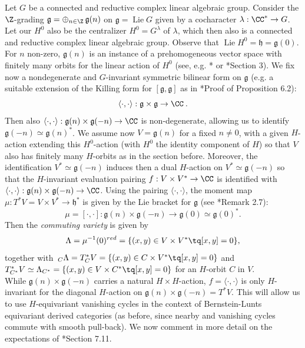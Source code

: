 \documentclass[11pt,letterpaper]{amsart}
\numberwithin{equation}{section}
\begin{document}
Let $G$ be a connected and reductive complex linear algebraic group. 
Consider the $\Z$-grading $\mathfrak{g} = \mathop{\oplus}_{n\in \Z} \mathfrak{g}(n)$ on $\mathfrak{g} = \operatorname{Lie} G$ given by a cocharacter $\lambda : \CC^* \to G$. 
Let our $H^0$ also be the centralizer
$H^0 = G^\lambda$  of $\lambda$, which then also is a connected and reductive complex linear algebraic group.
Observe that $\operatorname{Lie} H^0 = \mathfrak{h} = \mathfrak{g}(0)$.
For $n$ non-zero, $\mathfrak{g}(n)$ is an instance of a prehomogeneous vector space  with finitely many orbits for the linear action of $H^0$ (see, e.g. \cite{Vin76}*{} or 
\cite{Lus95}*{Section 3}). We fix now a nondegenerate and $G$-invariant symmetric bilinear form on $\mathfrak{g}$ (e.g. a suitable extension of the
Killing form for $[\mathfrak{g},\mathfrak{g}]$ 
as in \cite{CFMMX22}*{Proof of Proposition 6.2}):
$$\langle \cdot , \cdot\rangle : \mathfrak{g}\times \mathfrak{g} \to \CC\:.$$
Then also $\langle \cdot , \cdot\rangle : \mathfrak{g}(n)\times \mathfrak{g}(-n) \to \CC$ is non-degenerate, allowing us to identify  $\mathfrak{g}(-n) \simeq \mathfrak{g}(n)^*$.
We assume now $V=\mathfrak{g}(n)$ for a fixed $n\ne 0$, with a given $H$-action  extending this $H^0$-action (with $H^0$ the identity component of $H$)
so that $V$ also has finitely many $H$-orbits as in the section before.
Moreover, the identification $V^*\simeq \mathfrak{g}(-n)$ induces then a dual $H$-action on $V^*\simeq \mathfrak{g}(-n)$ so that the $H$-invariant evaluation pairing $f: V\times V^*\to \CC$
is identified with $\langle \cdot , \cdot\rangle : \mathfrak{g}(n)\times \mathfrak{g}(-n) \to \CC$.
Using the pairing $\langle \cdot , \cdot\rangle$, the moment map $\mu: T^*V=V\times V^* \to \mathfrak{h}^*$ 
is given by the Lie bracket for $\mathfrak{g}$ (see \cite{Tev05}*{Remark 2.7}):
\[
\mu = [\cdot , \cdot ] : \mathfrak{g}(n)\times \mathfrak{g}(-n) \to \mathfrak{g}(0)\simeq \mathfrak{g}(0)^*.
\]
Then the {\it commuting variety} is given by
\[
\Lambda = \mu^{-1}(0)^{red} = \{ (x,y) \in V\times V^* \tq [x,y] =0 \},
\]
together with $\,_{C}\Lambda= T^*_CV = \{ (x,y) \in C\times V^* \tq [x,y] =0 \}$ and
$T^*_{C^*}V \simeq \Lambda_{C^*} = \{ (x,y) \in V\times C^* \tq [x,y] =0 \}$ for an $H$-orbit $C$ in $V$.\\


While $\mathfrak{g}(n)\times \mathfrak{g}(-n)$ carries a natural $H\times H$-action, $f=\langle \cdot , \cdot\rangle$ is only $H$-invariant for the diagonal $H$-action on $\mathfrak{g}(n)\times \mathfrak{g}(-n)=T^*V$.
This will allow us to use $H$-equivariant vanishing cycles in the context of Bernstein-Lunts equivariant derived categories \cite{BL94} (as before, since nearby and vanishing cycles commute with smooth pull-back). 
We now comment in more detail on the expectations of \cite{CFMMX22}*{Section 7.11}.\\
\end{document}

